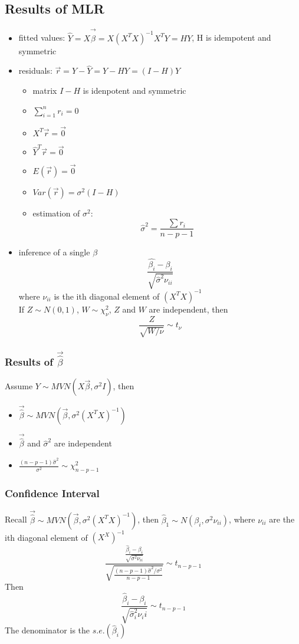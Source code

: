 \documentclass[11pt]{article}
\begin{document}
\subsection{Results of MLR}
\begin{itemize}
    \item fitted values: $\hat{Y} = X\vec{\hat{\beta}} = X(X^TX)^{-1}X^TY = HY$, H is idempotent and symmetric 
    \item residuals: $\vec{r} = Y-\hat{Y}=Y-HY=(I-H)Y$
    \begin{itemize}
        \item matrix $I-H$ is idenpotent and symmetric 
        \item $\sum_{i=1}^{n}r_i=0$
        \item $X^T\vec{r}=\vec{0}$
        \item $\hat{Y}^T\vec{r}=\vec{0}$
        \item $E(\vec{r})=\vec{0}$
        \item $Var(\vec{r})=\sigma^2(I-H)$
        \item estimation of $\sigma^2$: \[\hat{\sigma}^2=\frac{\sum r_i}{n-p-1}\]
    \end{itemize}
    \item inference of a single $\beta$ \[\frac{\hat{\beta_i}-\beta_i}{\sqrt{\hat{\sigma}^2\nu_{ii}}}\]
    where $\nu_{ii}$ is the ith diagonal element of $(X^TX)^{-1}$ \\
    If $Z\sim N(0,1)$, $W\sim \chi^2_{\nu}$, $Z$ and $W$ are independent, then \[\frac{Z}{\sqrt{W/\nu}}\sim t_\nu\]
\end{itemize}
\subsubsection{Results of $\vec{\hat{\beta}}$}
Assume $Y\sim MVN(X\vec{\beta}, \sigma^2I)$, then 
\begin{itemize}
    \item $\vec{\hat{\beta}}\sim MVN(\vec{\beta}, \sigma^2(X^TX)^{-1})$
    \item $\vec{\hat{\beta}}$ and $\hat{\sigma}^2$ are independent 
    \item $\frac{(n-p-1)\hat{\sigma}^2}{\sigma^2}\sim\chi^2_{n-p-1}$
\end{itemize}
\subsubsection{Confidence Interval}
Recall $\vec{\hat{\beta}}\sim MVN(\vec{\beta}, \sigma^2(X^TX)^{-1})$, then $\hat{\beta}_1\sim N(\beta_i, \sigma^2\nu_{ii})$, where $\nu_{ii}$ are the ith diagonal element of $(X^X)^{-1}$
\[\frac{\frac{\hat{\beta}_i-\beta_i}{\sqrt{\sigma^2\nu_{ii}}}}{\sqrt{\frac{(n-p-1)\hat{\sigma}^2/\sigma^2}{n-p-1}}}\sim t_{n-p-1}\]
Then \[\frac{\hat{\beta}_i-\beta_i}{\sqrt{\hat{\sigma}^2_i\nu{_ii}}}\sim t_{n-p-1}\]
The denominator is the $s.e.(\hat{\beta}_i)$
\end{document}
